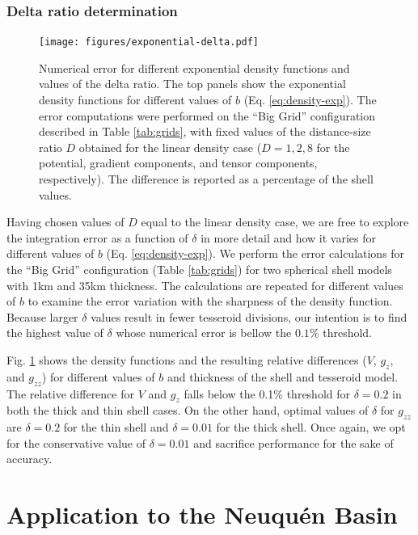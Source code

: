 \documentclass[extra, referee]{gji}
\begin{document}
\subsubsection{Delta ratio determination}

\begin{figure}
\centering
\texttt{[image: figures/exponential-delta.pdf]}
\caption{
    Numerical error for different exponential density functions and values of the delta
    ratio.
    The top panels show the exponential density functions for different values of $b$
    (Eq. \ref{eq:density-exp}).
    The error computations were performed on the ``Big Grid'' configuration described in
    Table \ref{tab:grids}, with fixed values of the distance-size ratio
    $D$ obtained for the linear density case ($D=1, 2, 8$ for the
    potential, gradient components, and tensor components, respectively).
    The difference is reported as a percentage of the shell values.
    }
\label{fig:delta-exponential}
\end{figure}

Having chosen values of $D$ equal to the linear density case, we are free to explore the
integration error as a function of $\delta$ in more detail and how it varies for
different values of $b$ (Eq. \ref{eq:density-exp}).
We perform the error calculations for the ``Big Grid'' configuration (Table
\ref{tab:grids}) for two spherical shell models with 1km and 35km thickness.
The calculations are repeated for different values of $b$ to examine the error variation
with the sharpness of the density function.
Because larger $\delta$ values result in fewer tesseroid divisions,
our intention is to find the highest value of $\delta$ whose numerical error is bellow
the $0.1\%$ threshold.

Fig. \ref{fig:delta-exponential} shows the density functions and the resulting relative
differences ($V$, $g_z$, and $g_{zz}$) for different values of $b$ and thickness of the
shell and tesseroid model.
The relative difference for $V$ and $g_z$ falls below the 0.1\% threshold for
$\delta = 0.2$ in both the thick and thin shell cases.
On the other hand, optimal values of $\delta$ for $g_{zz}$
are $\delta = 0.2$ for the thin shell and $\delta = 0.01$ for the thick shell.
Once again, we opt for the conservative value of $\delta = 0.01$ and sacrifice
performance for the sake of accuracy.



\section{Application to the Neuqu\'en Basin}
\end{document}
